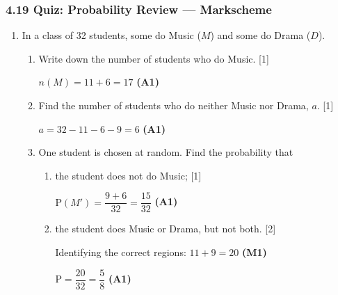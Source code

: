 \documentclass[12pt, twoside]{article}
\begin{document}
\subsubsection*{4.19 Quiz: Probability Review --- Markscheme}

\begin{enumerate}[itemsep=0.1cm]

\item In a class of 32 students, some do Music ($M$) and some do Drama ($D$).

\begin{center}
\vspace{-0.3cm}
\vspace{-0.3cm}
\end{center}

\begin{enumerate}[itemsep=0.3cm]
  \item Write down the number of students who do Music. \hfill [1]

  $n(M) = 11 + 6 = 17$ \hfill \textbf{(A1)}

  \item Find the number of students who do neither Music nor Drama, $a$. \hfill [1]

  $a = 32 - 11 - 6 - 9 = 6$ \hfill \textbf{(A1)}

  \item One student is chosen at random. Find the probability that
  \begin{enumerate}[label=(\roman*), itemsep=0.3cm]
    \item the student does not do Music; \hfill [1]

    $\mathrm{P}(M') = \dfrac{9 + 6}{32} = \dfrac{15}{32}$ \hfill \textbf{(A1)}

    \item the student does Music or Drama, but not both. \hfill [2]

    Identifying the correct regions: $11 + 9 = 20$ \hfill \textbf{(M1)}

    $\mathrm{P} = \dfrac{20}{32} = \dfrac{5}{8}$ \hfill \textbf{(A1)}
  \end{enumerate}


\end{enumerate}
\end{enumerate}
\end{document}
